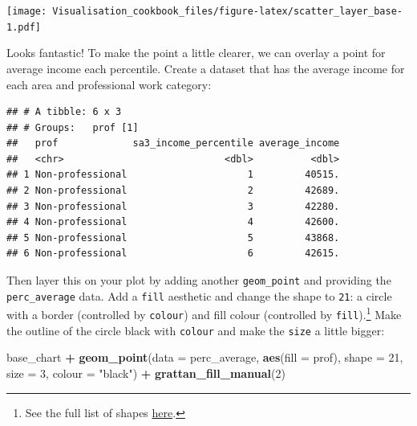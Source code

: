 \documentclass[]{book}
\newenvironment{Shaded}{\begin{snugshade}}{\end{snugshade}}
\newcommand{\DataTypeTok}[1]{\textcolor[rgb]{0.13,0.29,0.53}{#1}}
\newcommand{\DecValTok}[1]{\textcolor[rgb]{0.00,0.00,0.81}{#1}}
\newcommand{\KeywordTok}[1]{\textcolor[rgb]{0.13,0.29,0.53}{\textbf{#1}}}
\newcommand{\NormalTok}[1]{#1}
\newcommand{\OperatorTok}[1]{\textcolor[rgb]{0.81,0.36,0.00}{\textbf{#1}}}
\newcommand{\StringTok}[1]{\textcolor[rgb]{0.31,0.60,0.02}{#1}}
\begin{document}
\texttt{[image: Visualisation\_cookbook\_files/figure-latex/scatter\_layer\_base-1.pdf]}

Looks fantastic! To make the point a little clearer, we can overlay a point for average income each percentile. Create a dataset that has the average income for each area and professional work category:

\begin{Shaded}
\end{Shaded}

\begin{verbatim}
## # A tibble: 6 x 3
## # Groups:   prof [1]
##   prof             sa3_income_percentile average_income
##   <chr>                            <dbl>          <dbl>
## 1 Non-professional                     1         40515.
## 2 Non-professional                     2         42689.
## 3 Non-professional                     3         42280.
## 4 Non-professional                     4         42600.
## 5 Non-professional                     5         43868.
## 6 Non-professional                     6         42615.
\end{verbatim}

Then layer this on your plot by adding another \texttt{geom\_point} and providing the \texttt{perc\_average} data. Add a \texttt{fill} aesthetic and change the shape to \texttt{21}: a circle with a border (controlled by \texttt{colour}) and fill colour (controlled by \texttt{fill}).\footnote{See the full list of shapes \href{https://ggplot2.tidyverse.org/reference/scale_shape.html}{here}.}
Make the outline of the circle black with \texttt{colour} and make the \texttt{size} a little bigger:

\begin{Shaded}
\begin{Highlighting}[]
\NormalTok{base_chart }\OperatorTok{+}
\StringTok{  }\KeywordTok{geom_point}\NormalTok{(}\DataTypeTok{data =}\NormalTok{ perc_average,}
             \KeywordTok{aes}\NormalTok{(}\DataTypeTok{fill =}\NormalTok{ prof),}
             \DataTypeTok{shape =} \DecValTok{21}\NormalTok{,}
             \DataTypeTok{size =} \DecValTok{3}\NormalTok{, }
             \DataTypeTok{colour =} \StringTok{"black"}\NormalTok{) }\OperatorTok{+}\StringTok{ }
\StringTok{  }\KeywordTok{grattan_fill_manual}\NormalTok{(}\DecValTok{2}\NormalTok{)}
\end{Highlighting}
\end{Shaded}
\end{document}
